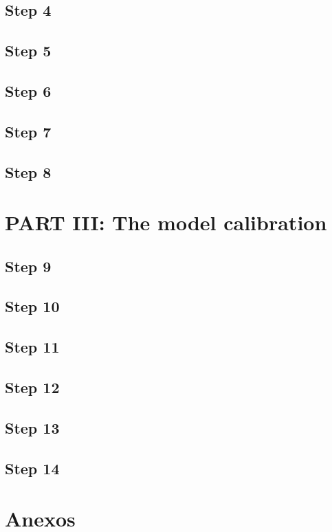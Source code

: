 \documentclass[12pt,a4paper]{article}
\begin{document}
\subsection{Step 4}

\subsection{Step 5}

\subsection{Step 6}

\subsection{Step 7}

\subsection{Step 8}

\section{PART III: The model calibration}

\subsection{Step 9}

\subsection{Step 10}

\subsection{Step 11}

\subsection{Step 12}

\subsection{Step 13}

\subsection{Step 14}


\clearpage
\section{Anexos}



\clearpage
\end{document}

